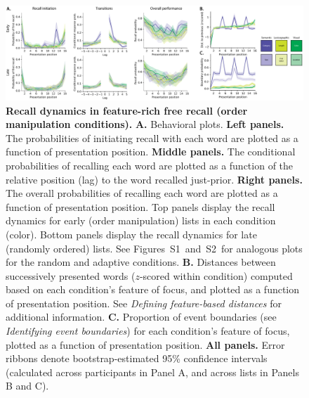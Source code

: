 \documentclass[11pt]{article}
\newcommand{\dynamicsRandom}{S1}
\newcommand{\dynamicsAdaptive}{S2}
\newcommand{\abbreviations}{S1}
\begin{document}
\begin{figure}[tp] \centering
\includegraphics[width=\textwidth]{figures/recall_dynamics}

\caption{\textbf{Recall dynamics in feature-rich free recall (order
manipulation conditions).} \textbf{A.} Behavioral plots. \textbf{Left panels.}
The probabilities of initiating recall with each word are plotted as a function
of presentation position. \textbf{Middle panels.} The conditional probabilities
of recalling each word are plotted as a function of the relative position (lag)
to the word recalled just-prior. \textbf{Right panels.} The overall
probabilities of recalling each word are plotted as a function of presentation
position. Top panels display the recall dynamics for early (order manipulation)
lists in each condition (color). Bottom panels display the recall dynamics for
late (randomly ordered) lists. See
Figures~\dynamicsRandom~and~\dynamicsAdaptive~for analogous plots for the
random and adaptive conditions. \textbf{B.} Distances between successively
presented words ($z$-scored within condition) computed based on each
condition's feature of focus, and plotted as a function of presentation
position. See \textit{Defining feature-based distances} for additional
information. \textbf{C.} Proportion of event boundaries (see
\textit{Identifying event boundaries}) for each condition's feature of focus,
plotted as a function of presentation position. \textbf{All panels.} Error
ribbons denote bootstrap-estimated 95\% confidence intervals (calculated across
participants in Panel A, and across lists in Panels B and C).}

\label{fig:recall-dynamics}
\end{figure}

\begin{table}[tp]
\centering
\tiny


\caption{\textbf{Comparing accuracy on early lists in the order manipulation
versus feature-rich conditions.} The $t$-tests reported in the table were
carried out across-participants, and reflect data aggregated across all early lists
from each participant. Abbreviations used in this table are defined in
Table~\abbreviations.}

\label{tab:order-manip-vs-feature-rich-accuracy-early}
\end{table}
\end{document}
